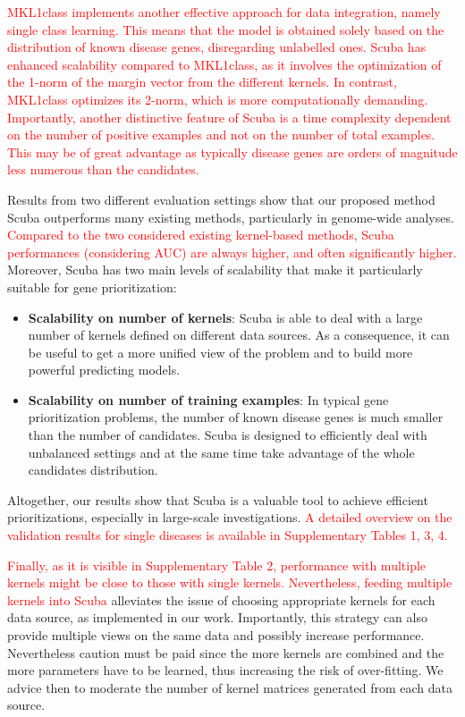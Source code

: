 \textcolor{red}{MKL1class implements another effective approach for data integration, namely single class learning. This means that the model is obtained solely based on the distribution of known disease genes, disregarding unlabelled ones. Scuba has enhanced scalability compared to MKL1class, as it involves the optimization of the 1-norm of the margin vector from the different kernels. In contrast, MKL1class optimizes its 2-norm, which is more computationally demanding. Importantly, another distinctive feature of Scuba is a time complexity dependent on the number of positive examples and not on the number of total examples. This may be of great advantage as typically disease genes are orders of magnitude less numerous than the candidates.} 

Results from two different evaluation settings show that our proposed method Scuba outperforms many existing methods, particularly in genome-wide analyses. \textcolor{red}{Compared to the two considered existing kernel-based methods, Scuba performances (considering AUC) are always higher, and often significantly higher.} Moreover, Scuba has two main levels of scalability that make it particularly suitable for gene prioritization:
\begin{itemize}
	\item \textbf{Scalability on number of kernels}: Scuba is able to deal with a large number of kernels defined on different data sources. As a consequence, it can be useful to get a more unified view of the problem and to build more powerful predicting models.
	
	\item \textbf{Scalability on number of training examples}: In typical gene prioritization problems, the number of known disease genes is much smaller than the number of candidates. Scuba is designed to efficiently deal with unbalanced settings and at the same time take advantage of the whole candidates distribution.
\end{itemize}

Altogether, our results show that Scuba is a valuable tool to achieve efficient prioritizations, especially in large-scale investigations. \textcolor{red}{A detailed overview on the validation results for single diseases is available in Supplementary Tables 1, 3, 4.}

\textcolor{red}{Finally, as it is visible in Supplementary Table 2, performance with multiple kernels might be close to those with single kernels. Nevertheless, feeding multiple kernels into Scuba} alleviates the issue of choosing appropriate kernels for each data source, as implemented in our work. Importantly, this strategy can also provide multiple views on the same data and possibly increase performance. Nevertheless caution must be paid since the more kernels are combined and the more parameters have to be learned, thus increasing the risk of over-fitting. We advice then to moderate the number of kernel matrices generated from each data source. 
